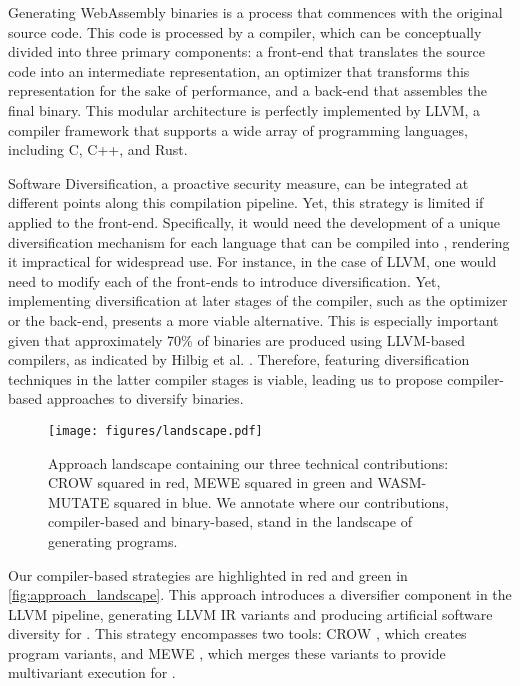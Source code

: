 

Generating  WebAssembly binaries is a process that commences with the original source code.
This code is processed by a compiler, which can be conceptually divided into three primary components: a front-end that translates the source code into an intermediate representation, an optimizer that transforms this representation for the sake of performance, and a back-end that assembles the final \Wasm binary. 
This modular architecture is perfectly implemented by LLVM, a compiler framework that supports a wide array of programming languages, including C, C++, and Rust. 

Software Diversification, a proactive security measure, can be integrated at different points along this compilation pipeline. 
Yet, this strategy is limited if applied to the front-end. 
Specifically, it would need the development of a unique diversification mechanism for each language that can be compiled into \Wasm, rendering it impractical for widespread use. 
For instance, in the case of LLVM, one would need to modify each of the front-ends to introduce diversification. 
Yet, implementing diversification at later stages of the compiler, such as the optimizer or the back-end, presents a more viable alternative. 
This is especially important given that approximately 70\% of \Wasm binaries are produced using LLVM-based compilers, as indicated by Hilbig et al. \cite{Hilbig2021AnES}.
Therefore, featuring diversification techniques in the latter compiler stages is viable, leading us to propose compiler-based approaches to diversify \Wasm binaries. 


\begin{figure}[h]
	\centering
	\texttt{[image: figures/landscape.pdf]}
	\caption{Approach landscape containing our three technical contributions: CROW squared in red, MEWE squared in green and WASM-MUTATE squared in blue. We annotate where our contributions, compiler-based and binary-based, stand in the landscape of generating \Wasm programs.}
	\label{fig:approach_landscape}
\end{figure}

Our compiler-based strategies are highlighted in red and green in \autoref{fig:approach_landscape}. 
This approach introduces a diversifier component in the LLVM pipeline, generating LLVM IR variants and producing artificial software diversity for \wasm. 
This strategy encompasses two tools: CROW \cite{CROW}, which creates \wasm program variants, and MEWE \cite{MEWE}, which merges these variants to provide multivariant execution for \wasm.


